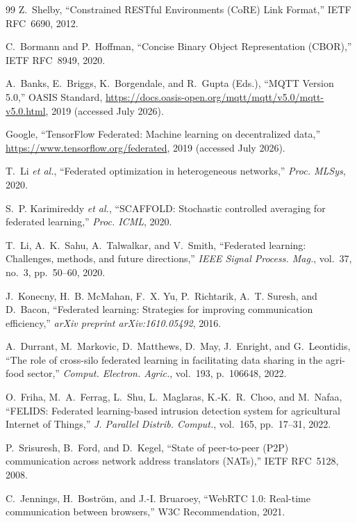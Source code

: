 ﻿\documentclass[journal]{IEEEtran}
\begin{document}
\begin{thebibliography}{99}
Z.~Shelby,
``Constrained RESTful Environments (CoRE) Link Format,''
IETF RFC~6690, 2012.

C.~Bormann and P.~Hoffman,
``Concise Binary Object Representation (CBOR),''
IETF RFC~8949, 2020.

A.~Banks, E.~Briggs, K.~Borgendale, and R.~Gupta (Eds.),
``MQTT Version 5.0,''
OASIS Standard, \url{https://docs.oasis-open.org/mqtt/mqtt/v5.0/mqtt-v5.0.html}, 2019 (accessed July 2026).

Google,
``TensorFlow Federated: Machine learning on decentralized data,''
\url{https://www.tensorflow.org/federated}, 2019 (accessed July 2026).

T.~Li \emph{et al.},
``Federated optimization in heterogeneous networks,''
\emph{Proc. MLSys}, 2020.

S.~P. Karimireddy \emph{et al.},
``SCAFFOLD: Stochastic controlled averaging for federated learning,''
\emph{Proc. ICML}, 2020.

T.~Li, A.~K.~Sahu, A.~Talwalkar, and V.~Smith,
``Federated learning: Challenges, methods, and future directions,''
\emph{IEEE Signal Process. Mag.}, vol.~37, no.~3, pp.~50--60, 2020.

J.~Konecny, H.~B. McMahan, F.~X. Yu, P.~Richtarik, A.~T. Suresh, and D.~Bacon,
``Federated learning: Strategies for improving communication efficiency,''
\emph{arXiv preprint arXiv:1610.05492}, 2016.

A.~Durrant, M.~Markovic, D.~Matthews, D.~May, J.~Enright, and G.~Leontidis,
``The role of cross-silo federated learning in facilitating data sharing in the agri-food sector,''
\emph{Comput. Electron. Agric.}, vol.~193, p.~106648, 2022.

O.~Friha, M.~A.~Ferrag, L.~Shu, L.~Maglaras, K.-K.~R.~Choo, and M.~Nafaa,
``FELIDS: Federated learning-based intrusion detection system for agricultural Internet of Things,''
\emph{J. Parallel Distrib. Comput.}, vol.~165, pp.~17--31, 2022.

P.~Srisuresh, B.~Ford, and D.~Kegel,
``State of peer-to-peer (P2P) communication across network address translators (NATs),''
IETF RFC~5128, 2008.

C.~Jennings, H.~Boström, and J.-I. Bruaroey,
``WebRTC 1.0: Real-time communication between browsers,''
W3C Recommendation, 2021.


\end{thebibliography}
\end{document}

